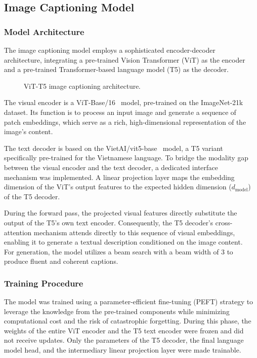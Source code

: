 \subsection{Image Captioning Model}

\subsubsection{Model Architecture}
The image captioning model employs a sophisticated encoder-decoder architecture, integrating a pre-trained Vision Transformer (ViT) as the encoder and a pre-trained Transformer-based language model (T5) as the decoder.

\begin{figure}[ht]
  \centerline{}
  \caption{ViT-T5 image captioning architecture.}
  \label{fig:img_cap_archi}
\end{figure}

The visual encoder is a ViT-Base/16~\cite{google-vit-base-patch16-224} model, pre-trained on the ImageNet-21k dataset. Its function is to process an input image and generate a sequence of patch embeddings, which serve as a rich, high-dimensional representation of the image's content.

The text decoder is based on the VietAI/vit5-base~\cite{phan-etal-2022-vit5} model, a T5 variant specifically pre-trained for the Vietnamese language. To bridge the modality gap between the visual encoder and the text decoder, a dedicated interface mechanism was implemented. A linear projection layer maps the embedding dimension of the ViT's output features to the expected hidden dimension ($d_{\text{model}}$) of the T5 decoder.

During the forward pass, the projected visual features directly substitute the output of the T5's own text encoder. Consequently, the T5 decoder's cross-attention mechanism attends directly to this sequence of visual embeddings, enabling it to generate a textual description conditioned on the image content. For generation, the model utilizes a beam search with a beam width of 3 to produce fluent and coherent captions.

\subsubsection{Training Procedure}
The model was trained using a parameter-efficient fine-tuning (PEFT) strategy to leverage the knowledge from the pre-trained components while minimizing computational cost and the risk of catastrophic forgetting. During this phase, the weights of the entire ViT encoder and the T5 text encoder were frozen and did not receive updates. Only the parameters of the T5 decoder, the final language model head, and the intermediary linear projection layer were made trainable.

